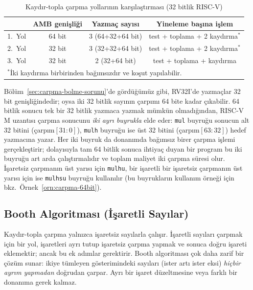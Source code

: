 \begin{table}[htbp]
\centering
\caption{Kaydır-topla çarpma yollarının karşılaştırması (32 bitlik RISC-V)}
\label{tab:carpma-yol-karsilastirma}
\small
\begin{tabular}{l c c c}
\toprule
& \textbf{AMB genişliği} & \textbf{Yazmaç sayısı} & \textbf{Yineleme başına işlem} \\
\midrule
1.\ Yol & 64 bit & 3 (64+32+64 bit) & test + toplama + 2 kaydırma$^*$ \\
2.\ Yol & 32 bit & 3 (32+32+64 bit) & test + toplama + 2 kaydırma$^*$ \\
3.\ Yol & 32 bit & 2 (32+64 bit) & test + toplama + kaydırma \\
\bottomrule
\multicolumn{4}{l}{\footnotesize $^*$İki kaydırma birbirinden bağımsızdır ve koşut yapılabilir.}
\end{tabular}
\end{table}

Bölüm~\ref{sec:carpma-bolme-sorunu}'de gördüğümüz gibi, RV32I'de yazmaçlar 32 bit genişliğindedir; oysa iki 32 bitlik sayının çarpımı 64 bite kadar çıkabilir. 64 bitlik sonucu tek bir 32 bitlik yazmaca yazmak mümkün olmadığından, RISC-V M uzantısı çarpma sonucunu \emph{iki ayrı buyrukla} elde eder: \texttt{mul} buyruğu sonucun alt 32 bitini (çarpım$[31{:}0]$), \texttt{mulh} buyruğu ise üst 32 bitini (çarpım$[63{:}32]$) hedef yazmacına yazar. Her iki buyruk da donanımda bağımsız birer çarpma işlemi gerçekleştirir; dolayısıyla tam 64 bitlik sonuca ihtiyaç duyan bir program bu iki buyruğu art arda çalıştırmalıdır ve toplam maliyet iki çarpma süresi olur. İşaretsiz çarpmanın üst yarısı için \texttt{mulhu}, bir işaretli bir işaretsiz çarpmanın üst yarısı için ise \texttt{mulhsu} buyruğu kullanılır (bu buyrukların kullanım örneği için bkz.\ Örnek~\ref{orn:carpma-64bit}).

\subsection{Booth Algoritması (İşaretli Sayılar)}
\label{sec:booth}

Kaydır-topla çarpma yalnızca işaretsiz sayılarla çalışır. İşaretli sayıları çarpmak için bir yol, işaretleri ayrı tutup işaretsiz çarpma yapmak ve sonuca doğru işareti eklemektir; ancak bu ek adımlar gerektirir. Booth algoritması çok daha zarif bir çözüm sunar: ikiye tümleyen gösterimindeki sayıları (ister artı ister eksi) \emph{hiçbir ayrım yapmadan} doğrudan çarpar. Ayrı bir işaret düzeltmesine veya farklı bir donanıma gerek kalmaz.

